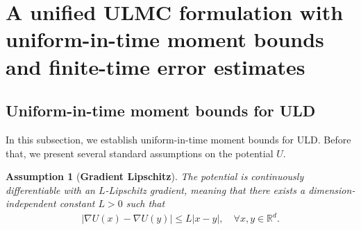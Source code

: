 \documentclass[12pt]{article}
\numberwithin{equation}{section}
\newcommand{\dd}{\mathrm{d}}
\newcommand{\U}{\nabla U}
\newtheorem{assumption}{Assumption}[section]
\begin{document}

\section{A unified ULMC formulation with uniform-in-time moment bounds and finite-time error estimates}
%
\label{sec:preliminary}


\subsection{Uniform-in-time moment bounds for ULD}

In this subsection, we establish uniform-in-time moment bounds for ULD. Before that, we present several standard assumptions on the potential $U$.

\begin{assumption}[\textbf{Gradient Lipschitz}]\label{as:Lip}
The potential is continuously differentiable with an $L$-Lipschitz gradient, meaning that there exists a dimension-independent constant $L > 0$ such that
\begin{align}\label{eq:lip}
    |\nabla U(x) - \nabla U(y)| \leq L |x - y|,
    \quad 
    \forall
    x, y \in
    \mathbb{R}^d.
    \end{align}
\end{assumption}
\end{document}
